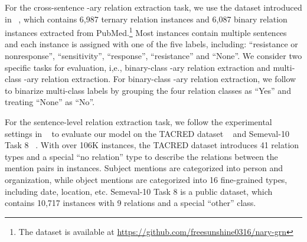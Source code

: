 \documentclass[11pt,a4paper]{article}
\begin{document}
For the cross-sentence -ary relation extraction task, we use the dataset introduced in ~\citep{Peng2017CrossSentenceNR}, which contains 6,987 ternary relation instances and 6,087 binary relation instances extracted from PubMed.\footnote{The dataset is available at \url{https://github.com/freesunshine0316/nary-grn}\label{n-ary_data}} Most instances contain multiple sentences and each instance is assigned with one of the five labels, including: ``resistance or nonresponse'', ``sensitivity'', ``response'', ``resistance''
and ``None''. We consider two specific tasks for evaluation, i,e., binary-class -ary relation extraction and multi-class -ary relation extraction.  For binary-class -ary relation extraction, we follow~\citep{Peng2017CrossSentenceNR} to binarize multi-class labels by grouping the four relation classes as ``Yes'' and treating ``None'' as ``No''.  



For the sentence-level relation extraction task,  we follow the experimental settings in ~\citep{Zhang2018GraphCO} to evaluate our model on the TACRED dataset ~\citep{Zhang2017PositionawareAA} and Semeval-10 Task 8 ~\citep{Hendrickx2010SemEval2010T8}. With over 106K instances, the TACRED dataset introduces 41 relation types and a special ``no relation'' type to describe the relations between the mention pairs in instances. Subject mentions are categorized into person and organization, while object mentions are categorized into 16 fine-grained types, including date, location, etc. Semeval-10 Task 8 is a public dataset, which contains 10,717 instances with 9 relations and a special ``other'' class. 
\end{document}
